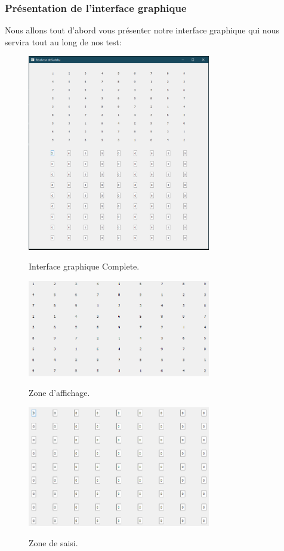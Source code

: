 \subsubsection{Présentation de l'interface graphique}
Nous allons tout d'abord vous présenter notre interface graphique qui nous servira tout au long de nos test:\newline

\begin{figure}[h]
  \begin{center}
\includegraphics[width=8cm]{./images/Interface_Complete.png}\label{Interface_complete}
\caption{Interface graphique Complete.}
\end{center}
\end{figure}


\begin{figure}[h]
  \begin{center}
\includegraphics[width=8cm]{./images/Interface_Affichage.png}\label{Interface_affichage}
\caption{Zone d'affichage.}
\end{center}
\end{figure}


\begin{figure}[h]
  \begin{center}
\includegraphics[width=8cm]{./images/Interface_saisi.png}\label{Interface_affichage}
\caption{Zone de saisi.}
\end{center}
\end{figure}

